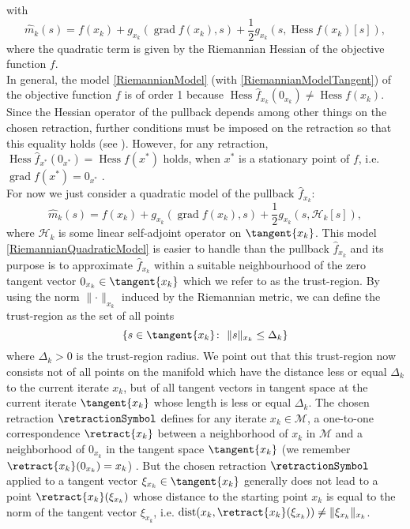 with
\begin{equation}\label{RiemannianModelTangent}
    \hat{m}_k( s ) = f(x_k) + g_{x_k}(\operatorname{grad} f(x_k), s ) + \frac{1}{2} g_{x_k}( s, \operatorname{Hess} f(x_k) [s]),
\end{equation}
where the quadratic term is given by the Riemannian Hessian of the objective function $f$. \\
In general, the model \cref{RiemannianModel} (with \cref{RiemannianModelTangent}) of the objective function $f$ is of order 1 because $\operatorname{Hess} \hat{f}_{x_k}(0_{x_k}) \neq \operatorname{Hess} f(x_k)$. Since the Hessian operator of the pullback depends among other things on the chosen retraction, further conditions must be imposed on the retraction so that this equality holds (see \cite[Proposition~5.5.5]{AbsilMahonySepulchre:2008}). However, for any retraction, $\operatorname{Hess} \hat{f}_{x^*}(0_{x^*}) = \operatorname{Hess} f(x^*)$ holds, when $x^*$ is a stationary point of $f$, i.e. $\operatorname{grad} f(x^*) = 0_{x^*}$ \cite[p.~138-139]{AbsilMahonySepulchre:2008}. \\
For now we just consider a quadratic model of the pullback $\hat{f}_{x_k}$:
\begin{equation}\label{RiemannianQuadraticModel}
    \hat{m}_k( s ) = f(x_k) + g_{x_k}(\operatorname{grad} f(x_k), s) + \frac{1}{2} g_{x_k}( s, \mathcal{H}_k [s]),
\end{equation}
where $\mathcal{H}_k$ is some linear self-adjoint operator on $\tangent{x_k}$. This model \cref{RiemannianQuadraticModel} is easier to handle than the pullback $\hat{f}_{x_k}$ and its purpose is to approximate $\hat{f}_{x_k}$ within a suitable neighbourhood of the zero tangent vector $0_{x_k} \in \tangent{x_k}$ which we refer to as the trust-region. By using the norm $\lVert \cdot \rVert_{x_k}$ induced by the Riemannian metric, we can define the trust-region as the set of all points
\begin{equation}\label{RiemannianTrustRegion}
    \{ s \in \tangent{x_k} \colon \ \lVert s \rVert_{x_k} \leq \Delta_k \}
\end{equation}
where $\Delta_k > 0$ is the trust-region radius. We point out that this trust-region now consists not of all points on the manifold which have the distance less or equal $\Delta_k$ to the current iterate $x_k$, but of all tangent vectors in tangent space at the current iterate $\tangent{x_k}$ whose length is less or equal $\Delta_k$. The chosen retraction $\retractionSymbol$ defines for any iterate $x_k \in \mathcal{M}$, a one-to-one correspondence $\retract{x_k}$ between a neighborhood of $x_k$ in $\mathcal{M}$ and a neighborhood of $0_{x_k}$ in the tangent space $\tangent{x_k}$ (we remember $\retract{x_k}(0_{x_k}) = x_k$) \cite[p.~304]{AbsilBakerGallivan:2007}. But the chosen retraction $\retractionSymbol$ applied to a tangent vector $\xi_{x_k} \in \tangent{x_k}$ generally does not lead to a point $\retract{x_k}(\xi_{x_k})$ whose distance to the starting point $x_k$ is equal to the norm of the tangent vector $\xi_{x_k}$, i.e. $\operatorname{dist}(x_k, \retract{x_k}(\xi_{x_k})) \neq \lVert \xi_{x_k} \rVert_{x_k}$. \\

